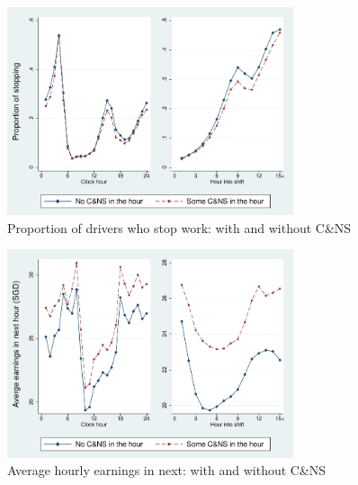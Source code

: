 \documentclass[reviewmode,AEJ]{AEA}
\begin{document}

\begin{figure}
	{\centering
		\includegraphics[width=0.75\textwidth]{./fg/modelfree_quit_vert.pdf}
		\caption{Proportion of drivers who stop work: with and without C\&NS}
		\label{fg:quitbyhour}
	}
\end{figure}

\begin{figure}
	{\centering
		\includegraphics[width=0.75\textwidth]{./fg/modelfree_earnings_vert.pdf}
		\caption{Average hourly earnings in next: with and without C\&NS}
		\label{fg:earningsbyhour}
	}
\end{figure}
\end{document}
